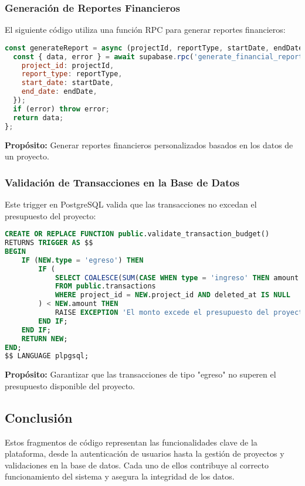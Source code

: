 \subsubsection*{Generación de Reportes Financieros}
El siguiente código utiliza una función RPC para generar reportes financieros:
\begin{lstlisting}[language=JavaScript]
const generateReport = async (projectId, reportType, startDate, endDate) => {
  const { data, error } = await supabase.rpc('generate_financial_report', {
    project_id: projectId,
    report_type: reportType,
    start_date: startDate,
    end_date: endDate,
  });
  if (error) throw error;
  return data;
};
\end{lstlisting}
\textbf{Propósito:} Generar reportes financieros personalizados basados en los datos de un proyecto.

\subsubsection*{Validación de Transacciones en la Base de Datos}
Este trigger en PostgreSQL valida que las transacciones no excedan el presupuesto del proyecto:
\begin{lstlisting}[language=SQL]
CREATE OR REPLACE FUNCTION public.validate_transaction_budget()
RETURNS TRIGGER AS $$
BEGIN
    IF (NEW.type = 'egreso') THEN
        IF (
            SELECT COALESCE(SUM(CASE WHEN type = 'ingreso' THEN amount ELSE -amount END), 0)
            FROM public.transactions
            WHERE project_id = NEW.project_id AND deleted_at IS NULL
        ) < NEW.amount THEN
            RAISE EXCEPTION 'El monto excede el presupuesto del proyecto.';
        END IF;
    END IF;
    RETURN NEW;
END;
$$ LANGUAGE plpgsql;
\end{lstlisting}
\textbf{Propósito:} Garantizar que las transacciones de tipo "egreso" no superen el presupuesto disponible del proyecto.

\subsection*{Conclusión}
Estos fragmentos de código representan las funcionalidades clave de la plataforma, desde la autenticación de usuarios hasta la gestión de proyectos y validaciones en la base de datos. Cada uno de ellos contribuye al correcto funcionamiento del sistema y asegura la integridad de los datos.